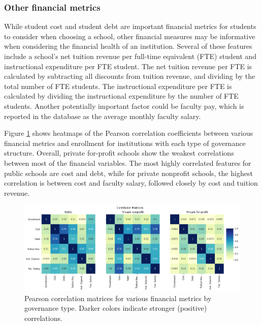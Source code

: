 \documentclass[11pt, letterpaper]{article}
\begin{document}
\subsubsection{Other financial metrics}
While student cost and student debt are important financial metrics for students to consider when choosing a school, other financial measures may be informative when considering the financial health of an institution. Several of these features include a school's net tuition revenue per full-time equivalent (FTE) student and instructional expenditure per FTE student. The net tuition revenue per FTE is calculated by subtracting all discounts from tuition revenue, and dividing by the total number of FTE students. The instructional expenditure per FTE is calculated by dividing the instructional expenditure by the number of FTE students. Another potentially important factor could be faculty pay, which is reported in the database as the average monthly faculty salary.

Figure \ref{fig:Correlation} shows heatmaps of the Pearson correlation coefficients between various financial metrics and enrollment for institutions with each type of governance structure. Overall, private for-profit schools show the weakest correlations between most of the financial variables. The most highly correlated features for public schools are cost and debt, while for private nonprofit schools, the highest correlation is between cost and faculty salary, followed closely by cost and tuition revenue.

\begin{figure}[h]
\begin{center}
\includegraphics[width=6.5in]{currentFinanceCorrelationHeatmap.png}
\caption{Pearson correlation matrices for various financial metrics by governance type. Darker colors indicate stronger (positive) correlations.} 
\label{fig:Correlation}
\end{center}
\end{figure}
\end{document}
